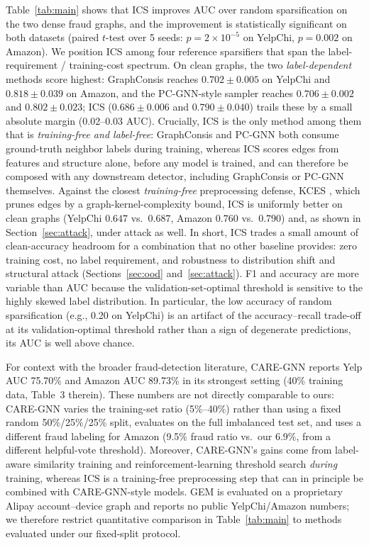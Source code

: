 \documentclass[11pt]{article}
\begin{document}
Table~\ref{tab:main} shows that ICS improves AUC over random sparsification on the two dense fraud graphs, and the improvement is statistically significant on both datasets (paired $t$-test over 5 seeds: $p=2\times10^{-5}$ on YelpChi, $p=0.002$ on Amazon). We position ICS among four reference sparsifiers that span the label-requirement / training-cost spectrum. On clean graphs, the two \emph{label-dependent} methods score highest: GraphConsis \cite{liu2020graphconsis} reaches $0.702\pm0.005$ on YelpChi and $0.818\pm0.039$ on Amazon, and the PC-GNN-style sampler \cite{liu2021pcgnn} reaches $0.706\pm0.002$ and $0.802\pm0.023$; ICS ($0.686\pm0.006$ and $0.790\pm0.040$) trails these by a small absolute margin (0.02--0.03 AUC). Crucially, ICS is the only method among them that is \emph{training-free and label-free}: GraphConsis and PC-GNN both consume ground-truth neighbor labels during training, whereas ICS scores edges from features and structure alone, before any model is trained, and can therefore be composed with any downstream detector, including GraphConsis or PC-GNN themselves. Against the closest \emph{training-free} preprocessing defense, KCES \cite{jia2026kces}, which prunes edges by a graph-kernel-complexity bound, ICS is uniformly better on clean graphs (YelpChi $0.647$ vs.\ $0.687$, Amazon $0.760$ vs.\ $0.790$) and, as shown in Section~\ref{sec:attack}, under attack as well. In short, ICS trades a small amount of clean-accuracy headroom for a combination that no other baseline provides: zero training cost, no label requirement, and robustness to distribution shift and structural attack (Sections~\ref{sec:ood} and~\ref{sec:attack}). F1 and accuracy are more variable than AUC because the validation-set-optimal threshold is sensitive to the highly skewed label distribution. In particular, the low accuracy of random sparsification (e.g., 0.20 on YelpChi) is an artifact of the accuracy--recall trade-off at its validation-optimal threshold rather than a sign of degenerate predictions, its AUC is well above chance.

For context with the broader fraud-detection literature, CARE-GNN \cite{dou2020caregnn} reports Yelp AUC 75.70\% and Amazon AUC 89.73\% in its strongest setting (40\% training data, Table~3 therein). These numbers are not directly comparable to ours: CARE-GNN varies the training-set ratio (5\%--40\%) rather than using a fixed random 50\%/25\%/25\% split, evaluates on the full imbalanced test set, and uses a different fraud labeling for Amazon (9.5\% fraud ratio vs.\ our 6.9\%, from a different helpful-vote threshold). Moreover, CARE-GNN's gains come from label-aware similarity training and reinforcement-learning threshold search \emph{during} training, whereas ICS is a training-free preprocessing step that can in principle be combined with CARE-GNN-style models. GEM \cite{liu2021fraudreview} is evaluated on a proprietary Alipay account--device graph and reports no public YelpChi/Amazon numbers; we therefore restrict quantitative comparison in Table~\ref{tab:main} to methods evaluated under our fixed-split protocol.
\end{document}
